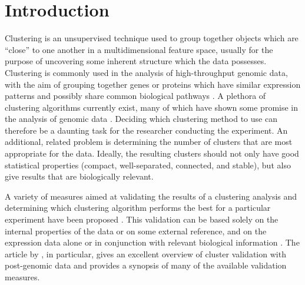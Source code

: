 \documentclass[11pt]{article}
\begin{document}





\section{Introduction}
\label{sec:introduction}

Clustering is an unsupervised technique used to group together objects which
are ``close'' to one another in a multidimensional feature space,
usually for the purpose of uncovering some inherent structure
which the data possesses.    
Clustering is commonly used in the
analysis of high-throughput genomic data, with the aim of 
grouping together genes or proteins which have similar
expression patterns and possibly share common biological pathways
\citep{DeR1997,Chu1998,Eis1998,Bha2007}. 
A plethora of clustering algorithms currently exist, many of which
have shown some promise in the analysis of genomic data \citep{Her2001,McL2002,Dem2003,Fu2007}.  
Deciding which clustering method to use can therefore be a
daunting task for the researcher conducting the experiment.  
An additional, related problem is determining the number of clusters
that are most appropriate for the data.  Ideally, the resulting clusters should
not only have good statistical properties (compact, well-separated,
connected, and stable), but also
give results that are biologically relevant.


A variety of measures aimed at validating the
results of a clustering analysis and determining which clustering
algorithm performs the best for a particular experiment have been
proposed \citep{Ker2001, Yeu2001, Dat2003}.  This validation can be based solely on the internal properties
of the data or on some external reference, and on the expression data
alone or in conjunction with relevant biological information
\citep{Gib2002, Gat2003, Bol2005, Dat2006}.  The article by
\citet{Han2005}, in particular, gives an excellent overview of cluster
validation with post-genomic data and provides a synopsis of many of
the available validation measures. 
\end{document}
